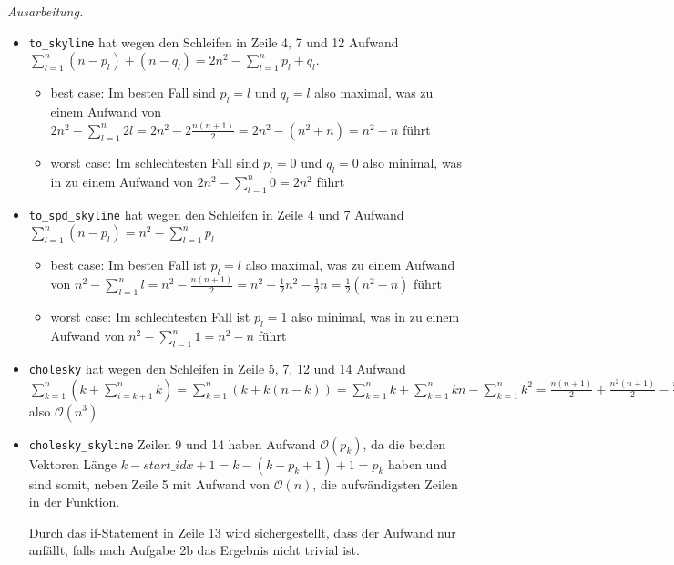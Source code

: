 \documentclass[]{article}
\newenvironment{ausarbeitung}{\vspace{3mm}\noindent\textit{Ausarbeitung.}}{}
\begin{document}
\begin{ausarbeitung}
	
	\begin{itemize}
		\item \texttt{to\_skyline} hat wegen den Schleifen in Zeile 4, 7 und 12 Aufwand $\sum_{l=1}^{n} (n-p_l)+(n-q_l) = 2n^2-\sum_{l=1}^{n}p_l+q_l$.
		\begin{itemize}
			\item best case: Im besten Fall sind $p_l = l$ und $q_l = l$ also maximal, was zu einem Aufwand von $2n^2-\sum_{l=1}^{n}2l = 2n^2 - 2\frac{n(n+1)}{2} = 2n^2-(n^2+n) = n^2 - n$ führt
			\item worst case: Im schlechtesten Fall sind $p_l=0$ und $q_l = 0$ also minimal, was in zu einem Aufwand von $2n^2 - \sum_{l=1}^{n}0 = 2n^2$ führt
		\end{itemize}
		
		\item \texttt{to\_spd\_skyline} hat wegen den Schleifen in Zeile 4 und 7 Aufwand $\sum_{l=1}^{n}(n-p_l) = n^2 - \sum_{l=1}^{n}p_l$
		\begin{itemize}
			\item best case: Im besten Fall ist $p_l = l$ also maximal, was zu einem Aufwand von $n^2 - \sum_{l=1}^{n}l = n^2 - \frac{n(n+1)}{2} = n^2 - \frac{1}{2}n^2 - \frac{1}{2}n = \frac{1}{2}(n^2-n)$ führt
			\item worst case: Im schlechtesten Fall ist $p_l=1$ also minimal, was in zu einem Aufwand von $n^2 - \sum_{l=1}^{n}1 = n^2 - n$ führt
		\end{itemize}
	
		\item \texttt{cholesky} hat wegen den Schleifen in Zeile 5, 7, 12 und 14 Aufwand $\sum_{k=1}^{n}(k + \sum_{i=k+1}^{n}k) = \sum_{k=1}^{n}(k+k(n-k)) = \sum_{k=1}^{n}k + \sum_{k=1}^{n}kn - \sum_{k=1}^{n}k^2 = \frac{n(n+1)}{2} + \frac{n^2(n+1)}{2} - \frac{n(n+1)(2n+1)}{6} = \frac{1}{6}n^3 + \frac{1}{2}n^2 + \frac{1}{3}n$ also $\mathcal{O}(n^3)$
		
		\item \texttt{cholesky\_skyline} Zeilen 9 und 14 haben Aufwand $\mathcal{O}(p_k)$, da die beiden Vektoren Länge $k - start\_idx + 1 = k - (k - p_k + 1) + 1 = p_k$ haben und sind somit, neben Zeile 5 mit Aufwand von $\mathcal{O}(n)$, die aufwändigsten Zeilen in der Funktion.
		
		Durch das if-Statement in Zeile 13 wird sichergestellt, dass der Aufwand nur anfällt, falls nach Aufgabe 2b das Ergebnis nicht trivial ist.
		

\end{itemize}
\end{ausarbeitung}
\end{document}
